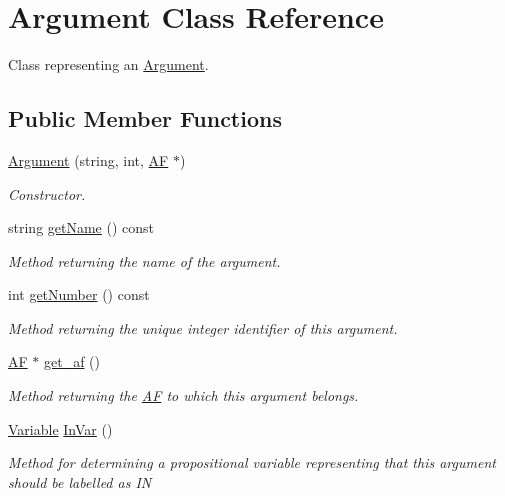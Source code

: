 \hypertarget{classArgument}{\section{Argument Class Reference}
\label{classArgument}
}


Class representing an \hyperlink{classArgument}{Argument}.  


\subsection*{Public Member Functions}
\begin{DoxyCompactItemize}
\item 
\hyperlink{classArgument_aa312e97860b77b102739b7c836f7c253}{Argument} (string, int, \hyperlink{classAF}{A\-F} $\ast$)
\begin{DoxyCompactList}\small\item\em Constructor. \end{DoxyCompactList}\item 
string \hyperlink{classArgument_a95323c2bfcbb4c0d494acc13f76cc28a}{get\-Name} () const 
\begin{DoxyCompactList}\small\item\em Method returning the name of the argument. \end{DoxyCompactList}\item 
int \hyperlink{classArgument_aa26daf8c55afbe7d0970b23fbdbc96ca}{get\-Number} () const 
\begin{DoxyCompactList}\small\item\em Method returning the unique integer identifier of this argument. \end{DoxyCompactList}\item 
\hyperlink{classAF}{A\-F} $\ast$ \hyperlink{classArgument_ad2e1361e07c13c5ec5784d33e58ef76e}{get\-\_\-af} ()
\begin{DoxyCompactList}\small\item\em Method returning the \hyperlink{classAF}{A\-F} to which this argument belongs. \end{DoxyCompactList}\item 
\hyperlink{classVariable}{Variable} \hyperlink{classArgument_a0f0599741585650c3bf44714d6a06df9}{In\-Var} ()
\begin{DoxyCompactList}\small\item\em Method for determining a propositional variable representing that this argument should be labelled as {\ttfamily I\-N} \end{DoxyCompactList}\item 

\end{DoxyCompactItemize}
